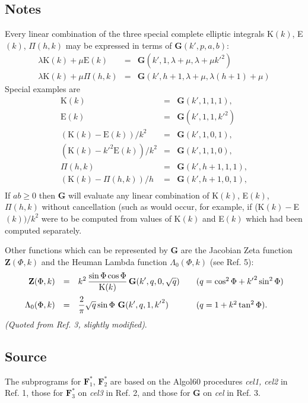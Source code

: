 \documentclass[]{article}
\begin{document}
\subsection{Notes}
Every linear combination of the three special complete elliptic
integrals K$(k)$, E$(k)$, $\Pi(h,k)$ may be expressed in terms of
$\mathbf{G}(k',p,a,b)$:
$$\begin{array}{rcl}
\lambda \mathrm{K}(k) + \mu \mathrm{E}(k) & = &
\mathbf{G}(k',1,\lambda+\mu,\lambda+\mu {k'}^2) \\
\lambda \mathrm{K}(k) + \mu \Pi(h,k) & = &
\mathbf{G}(k',h+1,\lambda+\mu,\lambda (h+1)+\mu)
\end{array} $$
Special examples are
$$\begin{array}{rcl}
\mathrm{K}(k)                           & = & \mathbf{G}(k',1,1,1), \\
\mathrm{E}(k)                           & = & \mathbf{G}(k',1,1,{k'}^2)\\
(\mathrm{K}(k)-\mathrm{E}(k))/k^2       & = & \mathbf{G}(k',1,0,1), \\
(\mathrm{K}(k)-{k'}^2\mathrm{E}(k))/k^2 & = & \mathbf{G}(k',1,1,0), \\
\Pi(h,k)                                & = & \mathbf{G}(k',h+1,1,1),\\
(\mathrm{K}(k)-\Pi(h,k))/h              & = & \mathbf{G}(k',h+1,0,1),\\
\end{array} $$
If $ab \ge 0$ then $\mathbf{G}$ will evaluate any linear
combination of K$(k)$, E$(k)$, $\Pi(h,k)$ without cancellation
(such as would occur, for example, if (K$(k)-$E$(k))/k^2$ were to be
computed from values of K$(k)$ and E$(k)$ which had been computed
separately.

Other functions which can be represented by $\mathbf{G}$ are the Jacobian
Zeta function $\mathbf{Z}(\Phi,k)$ and the Heuman Lambda function
$\Lambda_0(\Phi,k)$ (see Ref. 5):
$$\begin{array}{rcl@{\qquad}l}
\mathbf{Z}(\Phi,k) & = & \displaystyle k^2 \,
\frac{\sin \Phi \cos \Phi}{\mathrm{K}(k)} \, \mathbf{G}(k',q,0,\sqrt{q})
& (q = \cos^2 \Phi + {k'}^2 \sin^2 \Phi) \\[4mm]
\Lambda_0(\Phi,k) & = & \displaystyle \frac{2}{\pi}
\sqrt{q} \sin \Phi \ \mathbf{G}(k',q,1,{k'}^2) &
(q = 1 + k^2 \tan^2 \Phi).
\end{array} $$
\emph{(Quoted from Ref. 3, slightly modified)}.\\
\newpage
\subsection{Source}
The subprograms for $\mathbf{F}_1^*$, $\mathbf{F}_2^*$ are based on the
Algol60 procedures \emph{cel1, cel2} in Ref. 1, those for
$\mathbf{F}_3^*$ on \emph{cel3} in Ref. 2, and those for $\mathbf{G}$
on \emph{cel} in Ref. 3.
\end{document}
